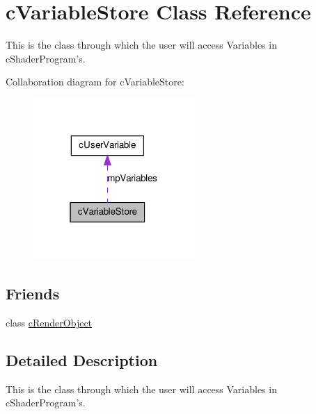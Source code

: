 \hypertarget{classc_variable_store}{
\section{cVariableStore Class Reference}
\label{classc_variable_store}
}


This is the class through which the user will access Variables in cShaderProgram's.  




Collaboration diagram for cVariableStore:\nopagebreak
\begin{figure}[H]
\begin{center}
\leavevmode
\includegraphics[width=175pt]{classc_variable_store__coll__graph}
\end{center}
\end{figure}
\subsection*{Friends}
\begin{DoxyCompactItemize}
\item 
\hypertarget{classc_variable_store_a2bd533513261d954e8f92ae187288b68}{
class \hyperlink{classc_variable_store_a2bd533513261d954e8f92ae187288b68}{cRenderObject}}
\label{classc_variable_store_a2bd533513261d954e8f92ae187288b68}

\end{DoxyCompactItemize}


\subsection{Detailed Description}
This is the class through which the user will access Variables in cShaderProgram's. 